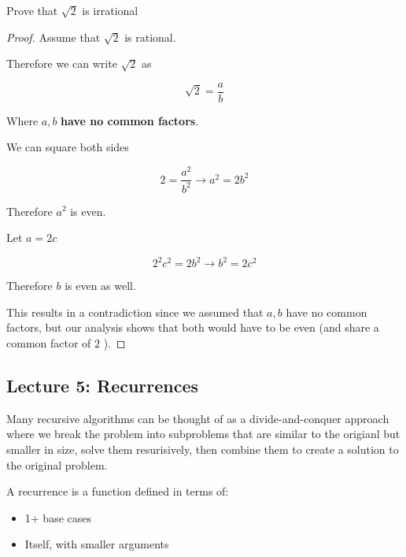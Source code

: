 \documentclass[../notes.tex]{subfiles}
\begin{document}
\begin{example}
	Prove that $ \sqrt{2}  $ is irrational
	\begin{proof}
		Assume that $ \sqrt{2}  $ is rational.

		Therefore we can write $ \sqrt{2}  $ as

		\begin{equation}
			\sqrt{2}  = \frac{a}{b}
		\end{equation}

		Where $ a, b $ \textbf{ have no common factors}.

		We can square both sides

		\begin{equation}
			2 = \frac{a^2}{b^2} \rightarrow a^2 = 2b^2
		\end{equation}

		Therefore $ a^2 $ is even. 

		Let $ a = 2c $ 

		\begin{equation}
			2^2 c^2 = 2b^2 \rightarrow b^2 = 2c^2
		\end{equation}

		Therefore $ b $ is even as well.

		This results in a contradiction since we assumed that $ a, b $ have no common factors, but our analysis shows that both would have to be even (and share a common factor of $ 2 $ ).
	\end{proof}
	
\end{example}


\subsection{Lecture 5: Recurrences}
Many recursive algorithms can be thought of as a divide-and-conquer approach where we break the problem into subproblems that are similar to the origianl but smaller in size, solve them resurisively, then combine them to create a solution to the original problem.


\begin{definition}
	A recurrence is a function defined in terms of:
	\begin{itemize}
		\item 1+ base cases
		\item Itself, with smaller arguments
	\end{itemize}
\end{definition}
\end{document}
